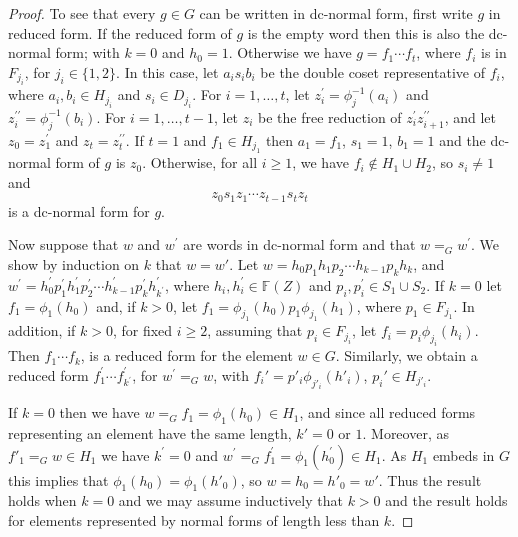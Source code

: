 \documentclass[a4paper,12pt]{article}
\numberwithin{equation}{section}
\numberwithin{figure}{section}
\newcommand{\FF}{\ensuremath{\mathbb{F}}}
\begin{document}
\begin{proof}
To see that every $g\in G$ can be written in dc-normal form, first
write $g$ in reduced form. If the reduced form of $g$ is the empty
word then this is also the dc-normal form; with $k=0$ and $h_0=1$. 
Otherwise we have $g=f_1\cdots f_t$, where $f_i$ is in $F_{j_i}$, for
$j_i\in \{1,2\}$. In this case, let $a_is_ib_i$
be the double coset representative of $f_i$, where 
$a_i,b_i\in H_{j_i}$ and $s_i\in D_{j_i}$. For $i=1,\ldots ,t$,
 let $z^{\prime}_i=\phi_j^{-1}(a_i)$ and
$z^{\prime\prime}_i=\phi_j^{-1}(b_i)$. For $i=1,\ldots ,t-1$, let 
$z_i$ be the free reduction of $z^{\prime}_iz^{\prime\prime}_{i+1}$, 
and let $z_0=z^{\prime}_1$ and $z_t=
z^{\prime\prime}_t$. 
 If $t=1$ and $f_1\in H_{j_1}$ then $a_1=f_1$, $s_1=1$, $b_1=1$ and 
the dc-normal form of $g$ is $z_0$. Otherwise, for all $i\ge 1$, we 
have $f_i\notin H_1\cup H_2$, so $s_i\neq 1$ and 
\[z_0s_1z_1\cdots z_{t-1}s_tz_t\]
is a dc-normal form for $g$.

Now suppose that $w$ and $w^\prime$ are words in dc-normal form and that
$w=_G w^\prime$. We show by induction on $k$ that $w=w'$. 
Let $w=h_{0}p_1h_{1}p_2 \cdots h_{k-1}p_kh_{{k}}$,
and $w^\prime =h_{0}^\prime p_1^\prime h_{1}^\prime  p_2^\prime
\cdots h_{k-1}^\prime p_k^\prime h_{{k^\prime}}^\prime$, where
$h_i, h_i^\prime\in \FF(Z)$ and $p_i,p_i^\prime\in S_1\cup S_2$.
If $k=0$ let $f_1=\phi_1(h_0)$ and, if $k>0$, 
let $f_1=\phi_{j_1}(h_0)p_1\phi_{j_1}(h_1)$, where $p_1\in F_{j_1}$. 
 In addition, if $k>0$,  
 for fixed $i\ge 2$, assuming that $p_i\in F_{j_i}$, 
let $f_i=p_i\phi_{j_i}(h_i)$.
 Then $f_1\cdots f_k$, is
a reduced form for the element $w\in G$. Similarly, we obtain a reduced
form $f_1^\prime \cdots f_{k^\prime}^\prime$, for $w^\prime=_G w$, 
with
$f_i'=p'_i\phi_{j'_i}(h'_i)$, $p_i'\in H_{j'_i}$. 

If $k=0$ then we have $w=_G f_1=\phi_1(h_0)\in H_{1}$, and since all 
reduced forms representing an element have the same length, $k'=0$ or $1$. 
Moreover, as $f'_1=_G w\in H_1$ we have 
 $k^\prime =0$ and $w^\prime=_G f_1^\prime=\phi_1(h_0^\prime)\in H_1$.
As $H_1$ embeds in $G$ this implies that $\phi_1(h_0)=\phi_1(h'_0)$, so
$w=h_0=h'_0=w'$. Thus the result
holds when $k=0$ and we may assume inductively that $k>0$ and the result holds
for elements represented by normal forms of length less than $k$.


\end{proof}
\end{document}
